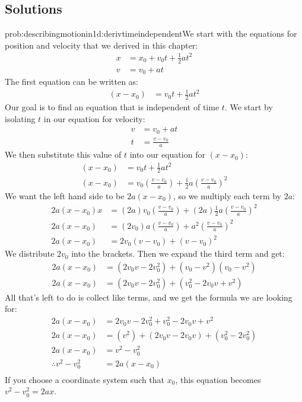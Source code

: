 \subsection{Solutions}
\begin{solution}{prob:describingmotionin1d:derivtimeindependent}\label{soln:describingmotionin1d:derivtimeindependent}We start with the equations for position and velocity that we derived in this chapter:
\begin{align*}
x&=x_0+v_0t+\frac{1}{2}at^2\\
v&=v_0+at
\end{align*}
The first equation can be written as:
\begin{align*}
(x-x_0)&=v_0t+\frac{1}{2}at^2
\end{align*}
Our goal is to find an equation that is independent of time $t$. We start by isolating $t$ in our equation for velocity:
\begin{align*}
v&=v_0+at\\
t&=\frac{v-v_0}{a}
\end{align*}
We then substitute this value of $t$ into our equation for $(x-x_0)$:
\begin{align*}
(x-x_0)&=v_0t+\frac{1}{2}at^2\\
(x-x_0)&=v_0\left(\frac{v-v_0}{a}\right)+\frac{1}{2}a\left(\frac{v-v_0}{a}\right)^2
\end{align*}
We want the left hand side to be $2a(x-x_0)$, so we multiply each term by $2a$:
\begin{align*}
2a(x-x_0)x&=(2a)v_0\left( \frac{v-v_0}{a}\right) +(2a)\frac{1}{2}a\left( \frac{v-v_0}{a}\right) ^2\\
2a(x-x_0)&=(2v_0)a\left(\frac{v-v_0}{a}\right)+a^2\left( \frac{v-v_0}{a}\right) ^2\\
2a(x-x_0)&=2v_0(v-v_0)+(v-v_0)^2
\end{align*}
We distribute $2v_0$ into the brackets. Then we expand the third term and get:
\begin{align*}
2a(x-x_0)&=(2v_0v-2v_0^2)+(v_0-v^2)(v_0-v^2)\\
2a(x-x_0)&=(2v_0v-2v_0^2)+(v_0^2-2v_0v+v^2)
\end{align*}
All that's left to do is collect like terms, and we get the formula we are looking for:
\begin{align*}
2a(x-x_0)&=2v_0v-2v_0^2+v_0^2-2v_0v+v^2\\
2a(x-x_0)&=(v^2)+(2v_0v-2v_0v)+(v_0^2-2v_0^2)\\
2a(x-x_0)&=v^2-v_0^2\\
\therefore v^2-v_0^2&=2a(x-x_0)\\
\end{align*}
If you choose a coordinate system such that $x_0$, this equation becomes $v^2-v_0^2=2ax$.
\end{solution}

